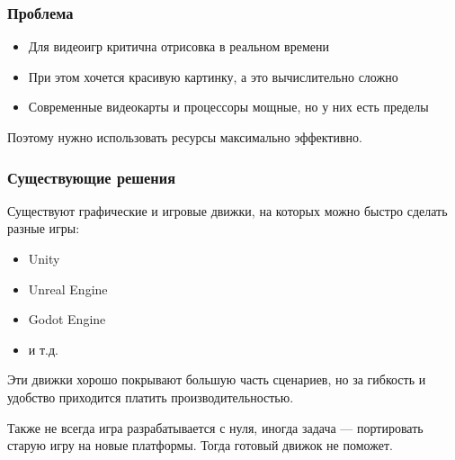 \begin{frame}
    \frametitle{Проблема}
    \begin{itemize}
        \item Для видеоигр критична отрисовка в реальном времени
        \item При этом хочется красивую картинку,
        а это вычислительно сложно
        \item Современные видеокарты и процессоры мощные,
        но у них есть пределы
    \end{itemize}

    \bigskip

    Поэтому нужно использовать
    ресурсы максимально эффективно.
\end{frame}

\begin{frame}
    \frametitle{Существующие решения}
    Существуют графические и игровые движки,
    на которых можно быстро сделать разные игры:
    \begin{itemize}
        \item Unity
        \item Unreal Engine
        \item Godot Engine
        \item и т.д.
    \end{itemize}

    \bigskip

    Эти движки хорошо покрывают большую часть сценариев,
    но за гибкость и удобство приходится платить
    производительностью.

    \bigskip

    Также не всегда игра разрабатывается с нуля,
    иногда задача --- портировать старую игру
    на новые платформы.
    Тогда готовый движок не поможет.
\end{frame}
